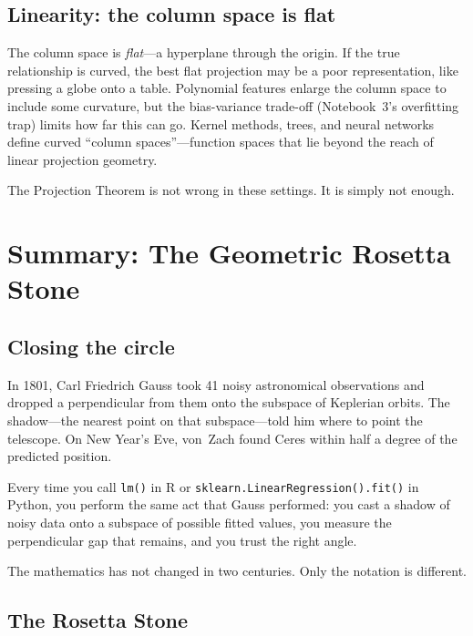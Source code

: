 \subsection{Linearity: the column space is flat}

The column space is \emph{flat}---a hyperplane through the origin.
If the true relationship is curved, the best flat projection may be
a poor representation, like pressing a globe onto a table.
Polynomial features enlarge the column space to include some curvature,
but the bias-variance trade-off (Notebook~3's overfitting trap) limits
how far this can go.
Kernel methods, trees, and neural networks define curved ``column
spaces''---function spaces that lie beyond the reach of linear
projection geometry.

The Projection Theorem is not wrong in these settings.  It is simply
not enough.


\section{Summary: The Geometric Rosetta Stone}\label{sec:rosetta}

\subsection*{Closing the circle}

In 1801, Carl Friedrich Gauss took 41 noisy astronomical observations and
dropped a perpendicular from them onto the subspace of Keplerian orbits.
The shadow---the nearest point on that subspace---told him where to
point the telescope.  On New Year's Eve, von~Zach found Ceres within
half a degree of the predicted position.

Every time you call \texttt{lm()} in R or
\texttt{sklearn.LinearRegression().fit()} in Python, you perform
the same act that Gauss performed: you cast a shadow of noisy data
onto a subspace of possible fitted values, you measure the
perpendicular gap that remains, and you trust the right angle.

The mathematics has not changed in two centuries.  Only the notation
is different.

\subsection*{The Rosetta Stone}

